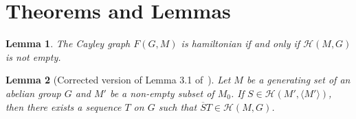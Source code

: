 \documentclass{article}
\newtheorem{lemma}{Lemma}
\begin{document}
\section{Theorems and Lemmas}

\begin{lemma}
    The Cayley graph $F(G, M)$ is hamiltonian if and only if $\mathcal{H}(M, G)$ is not empty.
\end{lemma}

\begin{lemma}[Corrected version of Lemma 3.1 of~\cite{marusic1983}]
    Let $M$ be a generating set of an abelian group $G$ and $M'$ be a non-empty subset of $M_0$. If $S \in \mathcal{H}(M', \langle M' \rangle)$, then there exists a sequence $T$ on $G$ such that $\overline{S}T \in \mathcal{H}(M, G)$.
\end{lemma}
\end{document}
